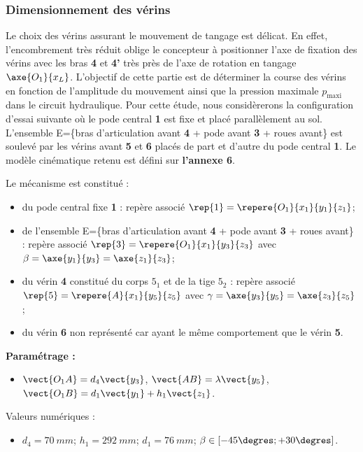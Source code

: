 \subsubsection{Dimensionnement des vérins}
Le choix des vérins assurant le mouvement de tangage est délicat. En effet, l’encombrement très réduit oblige le
concepteur à positionner l’axe de fixation des vérins avec les bras \textbf{4} et \textbf{4’} très près de l’axe de rotation en tangage $\axe{O_1}{x_L}$. L’objectif de cette partie est de déterminer la course des vérins en fonction de l’amplitude du mouvement ainsi que la pression maximale $p_{\text{maxi}}$ dans le circuit hydraulique. Pour cette étude, nous considèrerons la configuration d’essai suivante où le pode central \textbf{1} est fixe et placé parallèlement au sol. L’ensemble E=\{bras d’articulation avant \textbf{4} + pode avant \textbf{3} + roues avant\} est soulevé par les vérins avant \textbf{5} et \textbf{6} placés de part et d’autre du pode central \textbf{1}. Le modèle cinématique retenu est défini sur \textbf{l’annexe 6}.

Le mécanisme est constitué : 
\begin{itemize}
 \item du pode central fixe \textbf{1} : repère associé $\rep{1}=\repere{O_1}{x_1}{y_1}{z_1}$;
 \item de l'ensemble  E=\{bras d’articulation avant \textbf{4} + pode avant \textbf{3} + roues avant\} : repère associé $\rep{3}=\repere{O_1}{x_1}{y_3}{z_3}$ avec $\beta = \axe{y_1}{y_3} =\axe{z_1}{z_3}$;
 \item du vérin \textbf{4} constitué du corps \textbf{$5_1$} et de la tige \textbf{$5_2$} : repère associé $\rep{5}=\repere{A}{x_1}{y_5}{z_5}$ avec
  $\gamma = \axe{y_3}{y_5}= \axe{z_3}{z_5}$;
 \item du vérin \textbf{6} non représenté car ayant le même comportement que le vérin \textbf{5}.
\end{itemize}

\textbf{Paramétrage :}
\begin{itemize}
 \item $\vect{O_1 A}=d_4\vect{y_3}$, $\vect{AB}=\lambda\vect{y_5}$, $\vect{O_1 B}=d_1\vect{y_1}+h_1\vect{z_1}$.
\end{itemize}

Valeurs numériques : 
\begin{itemize}
 \item $d_4 =\SI{70}{mm}$; $h_1 =\SI{292}{mm}$; $d_1 =\SI{76}{mm}$; $\beta \in \left[ -45\degres;+30\degres\right]$.
\end{itemize}

